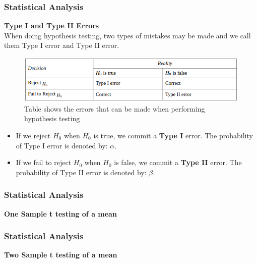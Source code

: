 \documentclass{beamer}
\begin{document}

\begin{frame}
\frametitle{Statistical Analysis}
\textbf{Type I and Type II Errors}\\
\vspace{0.3cm}
When doing hypothesis testing, two types of mistakes may be made and we call them Type I error and Type II error.
\begin{figure}
\includegraphics[scale=0.4]{t1t2_error}
\caption{Table shows the errors that can be made when performing hypothesis testing}
\end{figure}
\vspace{-1cm}
\begin{itemize}
\vspace{0.2cm}
\item If we reject $H_0$ when $H_0$ is true, we commit a \textbf{Type I} error. The probability of Type I error is denoted by: $\alpha$.
\vspace{0.2cm}
\item If we fail to reject $H_0$ when $H_0$ is false, we commit a \textbf{Type II} error. The probability of Type II error is denoted by: $\beta$.
\end{itemize}
\end{frame}


\begin{frame}
\frametitle{Statistical Analysis}
\textbf{One Sample t testing of a mean}\\
\vspace{0.3cm}
\end{frame}


\begin{frame}
\frametitle{Statistical Analysis}
\textbf{Two Sample t testing of a mean}\\
\vspace{0.3cm}
\end{frame}

\end{document}
